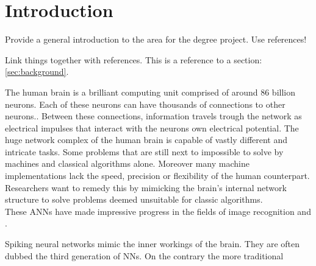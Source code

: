 \chapter{Introduction}

Provide a general introduction to the area for the degree project. Use references!

Link things together with references. This is a reference to a section: \ref{sec:background}.



The human brain is a brilliant computing unit comprised of around 86 billion\cite{azevedo_equal_2009} neurons. Each of these neurons can have thousands of connections to other neurons.. Between these connections, information travels trough the network as electrical impulses that interact with the neurons own electrical potential. The huge network complex of the human brain is capable of vastly different and intricate tasks. Some problems that are still next to impossible to solve by machines and classical algorithms alone. Moreover many machine implementations lack the speed, precision or flexibility of the human counterpart.\\
Researchers want to remedy this by mimicking the brain's internal network structure to solve problems deemed unsuitable for classic algorithms.\\
These \acp{ANN} have made impressive progress in the fields of image recognition and .



Spiking neural networks mimic the inner workings of the brain. They are often dubbed the third generation of \acp{NN}. On the contrary the more traditional

